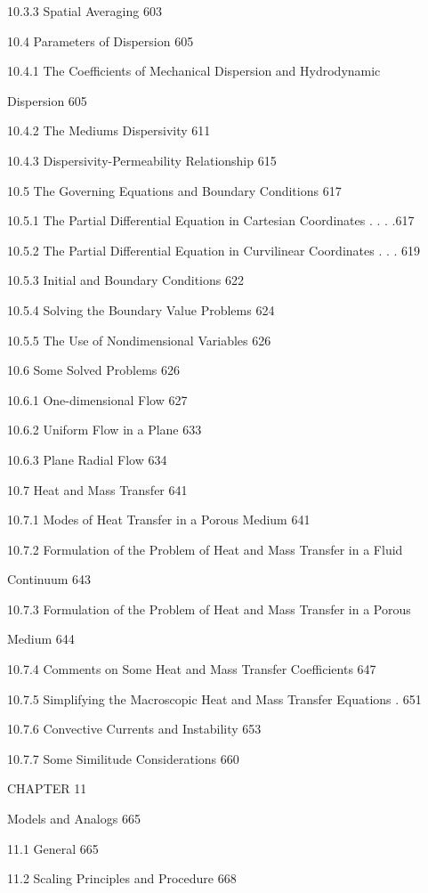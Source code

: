 \documentclass[
  11pt,
]{article}
\begin{document}
10.3.3 Spatial Averaging 603 \par
10.4 Parameters of Dispersion 605 \par
10.4.1 The Coefficients of Mechanical Dispersion and Hydrodynamic \par
Dispersion 605 \par
10.4.2 The Medium\textquotesingle s Dispersivity 611 \par
10.4.3 Dispersivity-Permeability Relationship 615 \par
10.5 The Governing Equations and Boundary Conditions 617 \par
10.5.1 The Partial Differential Equation in Cartesian Coordinates . . . .617 \par
10.5.2 The Partial Differential Equation in Curvilinear Coordinates . . . 619 \par
10.5.3 Initial and Boundary Conditions 622 \par
10.5.4 Solving the Boundary Value Problems 624 \par
10.5.5 The Use of Nondimensional Variables 626 \par
10.6 Some Solved Problems 626 \par
10.6.1 One-dimensional Flow 627 \par
10.6.2 Uniform Flow in a Plane 633 \par
10.6.3 Plane Radial Flow 634 \par
10.7 Heat and Mass Transfer 641 \par
10.7.1 Modes of Heat Transfer in a Porous Medium 641 \par
10.7.2 Formulation of the Problem of Heat and Mass Transfer in a Fluid \par
Continuum 643 \par
10.7.3 Formulation of the Problem of Heat and Mass Transfer in a Porous \par
Medium 644 \par
10.7.4 Comments on Some Heat and Mass Transfer Coefficients 647 \par
10.7.5 Simplifying the Macroscopic Heat and Mass Transfer Equations . 651 \par
10.7.6 Convective Currents and Instability 653 \par
10.7.7 Some Similitude Considerations 660 \par
CHAPTER 11 \par
Models and Analogs 665 \par
11.1 General 665 \par
11.2 Scaling Principles and Procedure 668 \par
\end{document}
